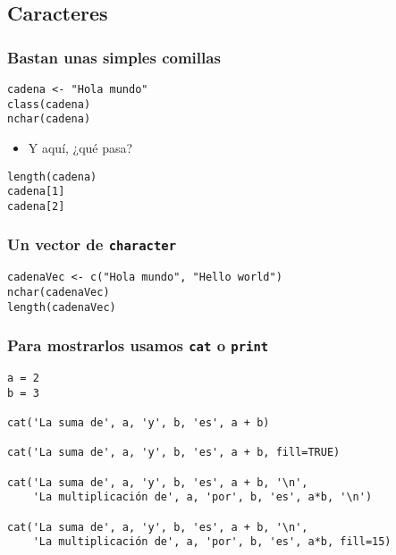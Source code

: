 \documentclass[xcolor={usenames,svgnames,dvipsnames}]{beamer}
\begin{document}
\subsection{Caracteres}
\label{sec-5-2}
\begin{frame}[fragile]
\frametitle{Bastan unas simples comillas}
\label{sec-5-2-1}



\lstset{language=R}
\begin{lstlisting}
cadena <- "Hola mundo"
class(cadena)
nchar(cadena)
\end{lstlisting}

\begin{itemize}
\item Y aquí, ¿qué pasa?
\end{itemize}

\lstset{language=R}
\begin{lstlisting}
length(cadena)
cadena[1]
cadena[2]
\end{lstlisting}
\end{frame}
\begin{frame}[fragile]
\frametitle{Un vector de \texttt{character}}
\label{sec-5-2-2}


\lstset{language=R}
\begin{lstlisting}
cadenaVec <- c("Hola mundo", "Hello world")
nchar(cadenaVec)
length(cadenaVec)
\end{lstlisting}
\end{frame}
\begin{frame}[fragile]
\frametitle{Para mostrarlos usamos \texttt{cat} o \texttt{print}}
\label{sec-5-2-3}



\lstset{language=R}
\begin{lstlisting}
a = 2
b = 3

cat('La suma de', a, 'y', b, 'es', a + b)

cat('La suma de', a, 'y', b, 'es', a + b, fill=TRUE)

cat('La suma de', a, 'y', b, 'es', a + b, '\n',
    'La multiplicación de', a, 'por', b, 'es', a*b, '\n')

cat('La suma de', a, 'y', b, 'es', a + b, '\n',
    'La multiplicación de', a, 'por', b, 'es', a*b, fill=15)
\end{lstlisting}
\end{frame}
\end{document}
